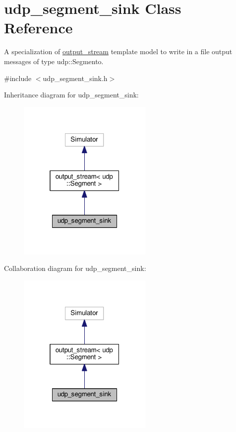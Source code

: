 \hypertarget{classudp__segment__sink}{}\section{udp\+\_\+segment\+\_\+sink Class Reference}
\label{classudp__segment__sink}


A specialization of \hyperlink{classoutput__stream}{output\+\_\+stream} template model to write in a file output messages of type udp\+::\+Segmento.  




{\ttfamily \#include $<$udp\+\_\+segment\+\_\+sink.\+h$>$}



Inheritance diagram for udp\+\_\+segment\+\_\+sink\+:\nopagebreak
\begin{figure}[H]
\begin{center}
\leavevmode
\includegraphics[width=184pt]{classudp__segment__sink__inherit__graph}
\end{center}
\end{figure}


Collaboration diagram for udp\+\_\+segment\+\_\+sink\+:\nopagebreak
\begin{figure}[H]
\begin{center}
\leavevmode
\includegraphics[width=184pt]{classudp__segment__sink__coll__graph}
\end{center}
\end{figure}

